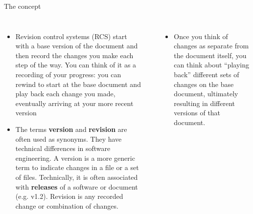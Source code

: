 \documentclass[english,aspectratio=169]{beamer}
\begin{document}
\begin{frame}{The concept}
\begin{columns}[t]

\column{8cm}
\begin{itemize}
\item {\footnotesize Revision control systems (RCS) start with a base version
of the document and then record the changes you make each step of the
way. You can think of it as a recording of your progress: you can
rewind to start at the base document and play back each change you
made, eventually arriving at your more recent version}
\item \footnotesize{The terms \textbf{version} and \textbf{revision} are often used as synonyms. They have technical differences in software engineering. A version is a more generic term to indicate changes in a file or
a set of files. Technically, it is often associated with \textbf{releases}
 of a software or document (e.g. v1.2). Revision is any recorded change
or combination of changes.}
\end{itemize}
    
\column{5.5cm}
\begin{center}

\par\end{center}
\begin{itemize}
\item \small{Once you think of changes as separate from the document itself,
you can think about \textquotedblleft playing back\textquotedblright{}
different sets of changes on the base document, ultimately resulting
in different versions of that document.}
\end{itemize}
\end{columns}

\end{frame}
%
\end{document}
